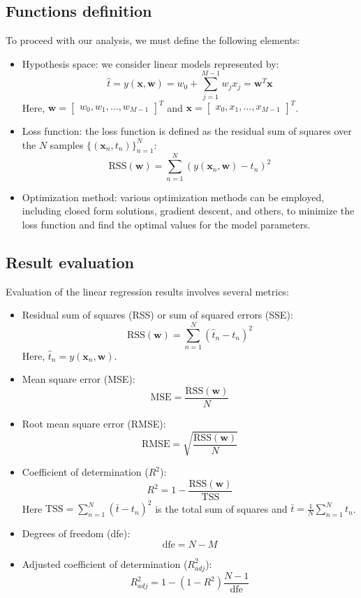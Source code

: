 \subsection{Functions definition}
To proceed with our analysis, we must define the following elements:
\begin{itemize}
    \item Hypothesis space: we consider linear models represented by:
        \[\hat{t}=y(\textbf{x},\textbf{w})=w_0+\sum_{j=1}^{M-1}w_jx_j=\textbf{w}^T\textbf{x}\]
        Here, $\textbf{w} = \begin{bmatrix} w_0, w_1, \dots , w_{M-1} \end{bmatrix}^T$ and $\textbf{x} = \begin{bmatrix} x_0, x_1, \dots , x_{M-1} \end{bmatrix}^T$.
    \item Loss function: the loss function is defined as the residual sum of squares over the $N$ samples $\{(\textbf{x}_n, t_n)\}^{N}_{n=1}$: 
        \[\text{RSS}(\textbf{w})=\sum_{n=1}^N\left( y(\textbf{x}_n,\textbf{w})-t_n \right)^2\]
    \item Optimization method: various optimization methods can be employed, including closed form solutions, gradient descent, and others, to minimize the loss function and find the optimal values for the model parameters.
\end{itemize}

\subsection{Result evaluation}
Evaluation of the linear regression results involves several metrics:
\begin{itemize}
    \item Residual sum of squares (RSS) or sum of squared errors (SSE):
        \[\text{RSS}(\textbf{w})=\sum_{n=1}^N\left(\hat{t}_n-t_n\right)^2\]
        Here, $\hat{t}_n=y(\textbf{x}_n,\textbf{w})$. 
    \item Mean square error (MSE):
        \[\text{MSE}=\dfrac{\text{RSS}(\textbf{w})}{N}\]
    \item Root mean square error (RMSE):
        \[\text{RMSE}=\sqrt{\dfrac{\text{RSS}(\textbf{w})}{N}}\]
    \item Coefficient of determination ($R^2$):
        \[R^2=1-\dfrac{\text{RSS}(\textbf{w})}{\text{TSS}}\]
        Here $\text{TSS}=\sum_{n=1}^{N}\left(\bar{t}-t_n\right)^2$ is the total sum of squares and $\bar{t}=\frac{1}{N}\sum_{n=1}^{N}t_n$. 
    \item Degrees of freedom (dfe):
        \[\text{dfe}=N-M\]
    \item Adjusted coefficient of determination ($R^2_{adj}$):
        \[R^2_{adj}=1-\left(1-R^2\right)\dfrac{N-1}{\text{dfe}}\]
\end{itemize}

